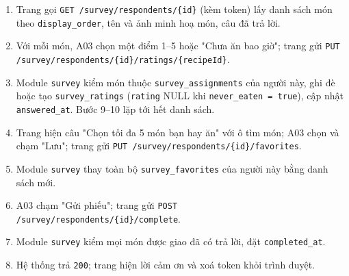 \begin{enumerate}
\item Trang gọi {\small\texttt{GET /\allowbreak{}\allowbreak{}survey/\allowbreak{}\allowbreak{}respondents/\allowbreak{}\allowbreak{}\{id\}}} (kèm token) lấy danh sách món theo {\small\texttt{display\_\allowbreak{}\allowbreak{}order}}, tên và ảnh minh hoạ món, câu đã trả lời.
\item Với mỗi món, A03 chọn một điểm 1--5 hoặc "Chưa ăn bao giờ"; trang gửi {\small\texttt{PUT /\allowbreak{}\allowbreak{}survey/\allowbreak{}\allowbreak{}respondents/\allowbreak{}\allowbreak{}\{id\}/\allowbreak{}\allowbreak{}ratings/\allowbreak{}\allowbreak{}\{recipeId\}}}.
\item Module {\small\texttt{survey}} kiểm món thuộc {\small\texttt{survey\_\allowbreak{}\allowbreak{}assignments}} của người này, ghi đè hoặc tạo {\small\texttt{survey\_\allowbreak{}\allowbreak{}ratings}} ({\small\texttt{rating}} NULL khi {\small\texttt{never\_\allowbreak{}\allowbreak{}eaten = true}}), cập nhật {\small\texttt{answered\_\allowbreak{}\allowbreak{}at}}. Bước 9--10 lặp tới hết danh sách.
\item Trang hiện câu "Chọn tối đa 5 món bạn hay ăn" với ô tìm món; A03 chọn và chạm "Lưu"; trang gửi {\small\texttt{PUT /\allowbreak{}\allowbreak{}survey/\allowbreak{}\allowbreak{}respondents/\allowbreak{}\allowbreak{}\{id\}/\allowbreak{}\allowbreak{}favorites}}.
\item Module {\small\texttt{survey}} thay toàn bộ {\small\texttt{survey\_\allowbreak{}\allowbreak{}favorites}} của người này bằng danh sách mới.
\item A03 chạm "Gửi phiếu"; trang gửi {\small\texttt{POST /\allowbreak{}\allowbreak{}survey/\allowbreak{}\allowbreak{}respondents/\allowbreak{}\allowbreak{}\{id\}/\allowbreak{}\allowbreak{}complete}}.
\item Module {\small\texttt{survey}} kiểm mọi món được giao đã có trả lời, đặt {\small\texttt{completed\_\allowbreak{}\allowbreak{}at}}.
\item Hệ thống trả {\small\texttt{200}}; trang hiện lời cảm ơn và xoá token khỏi trình duyệt.
\end{enumerate}
